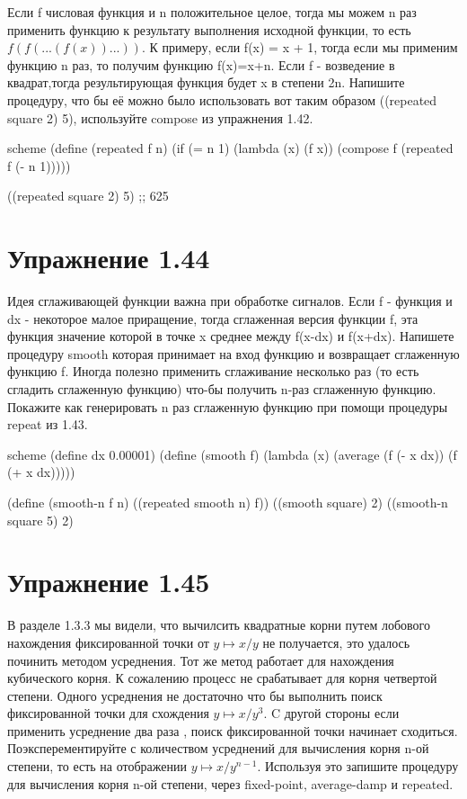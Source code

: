 Если f числовая функция и n положительное целое, тогда мы можем n раз применить функцию к результату выполнения исходной функции, то есть $f(f(...(f(x))...))$. К примеру, если f(x) = x + 1, тогда если мы применим функцию n раз, то получим функцию f(x)=x+n. Если f - возведение в квадрат,тогда результирующая функция будет x в степени 2n. Напишите процедуру, что бы её можно было использовать вот таким образом ((repeated square 2) 5), используйте compose из упражнения 1.42.

\begin{codelisting}{scheme}
(define (repeated f n)
  (if (= n 1)
      (lambda (x) (f x))
      (compose f (repeated f (- n 1)))))

((repeated square 2) 5) ;; 625
\end{codelisting}

\chapter{Упражнение 1.44}

Идея сглаживающей функции важна при обработке сигналов. Если f - функция и dx - некоторое малое приращение, тогда сглаженная версия функции f, эта функция  значение которой в точке x среднее между f(x-dx) и f(x+dx). Напишете процедуру smooth которая принимает на вход функцию и возвращает сглаженную функцию f. Иногда полезно применить сглаживание несколько раз (то есть сгладить сглаженную функцию) что-бы получить n-раз сглаженную функцию. Покажите как генерировать n раз сглаженную функцию при помощи процедуры repeat из 1.43.

\begin{codelisting}{scheme}
(define dx 0.00001)
(define (smooth f)
  (lambda (x) (average (f (- x dx)) (f (+ x dx)))))

(define (smooth-n f n)
  ((repeated smooth n) f))
((smooth square) 2)
((smooth-n square 5) 2)
\end{codelisting}


\chapter{Упражнение 1.45}

В разделе 1.3.3 мы видели, что вычилсить квадратные корни путем лобового нахождения фиксированной точки от $y\mapsto x/y$ не получается, это удалось починить методом усреднения. Тот же метод работает для нахождения кубического корня. К сожалению процесс не срабатывает для корня четвертой степени. Одного усреднения не достаточно что бы выполнить поиск фиксированной точки для схождения $y\mapsto x/y^3$. C другой стороны если применить усреднение два раза , поиск фиксированной точки начинает сходиться. Поэксперементируйте с количеством усреднений для вычисления корня n-ой степени, то есть на отображении $y\mapsto x/y^{n-1}$. Используя это запишите процедуру для вычисления корня n-ой степени, через fixed-point, average-damp и repeated.

